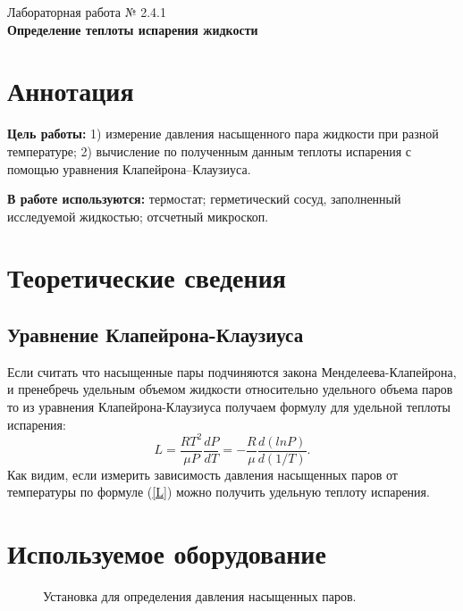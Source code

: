 \documentclass[a4paper,12pt]{article} %
\begin{document}
\begin{center}   
	\large{Лабораторная работа № 2.4.1\\\textbf{Определение теплоты испарения жидкости}}\\
\end{center}

\section{Аннотация}

\noindent\textbf{Цель работы:}
1) измерение давления насыщенного пара жидкости при разной температуре; 2) вычисление по полученным данным теплоты испарения с помощью уравнения Клапейрона–Клаузиуса.
	
\smallskip
\noindent\textbf{В работе используются:}
термостат; герметический сосуд, заполненный исследуемой жидкостью; отсчетный микроскоп.

\section{Теоретические сведения}

\subsection*{Уравнение Клапейрона-Клаузиуса}

Если считать что насыщенные пары подчиняются закона Менделеева-Клапейрона, и пренебречь удельным объемом жидкости относительно удельного объема паров то из уравнения Клапейрона-Клаузиуса получаем формулу для удельной теплоты испарения:
\begin{equation}\label{L}
    L = \frac{RT^2}{\mu P}\frac{dP}{dT} = - \frac{R}{\mu} \frac{d(ln P)}{d(1/T)}.
\end{equation}
Как видим, если измерить зависимость давления насыщенных паров от температуры по формуле (\ref{L}) можно получить удельную теплоту испарения.

\section{Используемое оборудование}

\begin{figure}[h]
    \caption{Установка для определения давления насыщенных паров.}
    \label{установка}
\end{figure}
\end{document}
